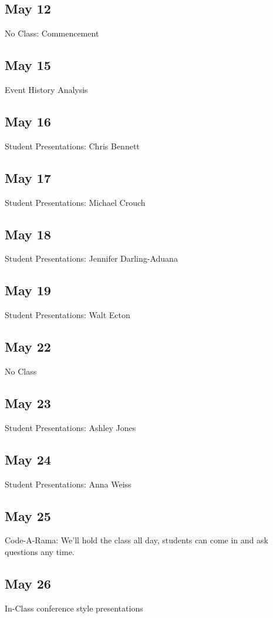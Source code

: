 \documentclass[10pt]{article}
\begin{document}
\subsection{May 12}
\label{sec:may-13}

No Class: Commencement

\subsection{May 15}

Event History Analysis



\subsection{May 16}
Student Presentations: Chris Bennett


\subsection{May 17}
Student Presentations: Michael Crouch


\subsection{May 18}
Student Presentations: Jennifer Darling-Aduana


\subsection{May 19}

Student Presentations: Walt Ecton

\subsection{May 22}
No Class


\subsection{May 23}
Student Presentations: Ashley Jones


\subsection{May 24} 
Student Presentations: Anna Weiss


\subsection{May 25}

Code-A-Rama: We'll hold the class all day, students can come in and
ask questions any time. 

\subsection{May 26}

In-Class conference style presentations
\end{document}
